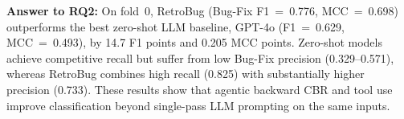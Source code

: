 

\begin{tcolorbox}[colback=gray!8, colframe=gray!50,
  boxrule=0.5pt, arc=2pt, left=4pt, right=4pt,
  top=3pt, bottom=3pt]
\textbf{Answer to RQ2:}
On fold~0, RetroBug (Bug-Fix F1~=~0.776, MCC~=~0.698) outperforms the
best zero-shot LLM baseline, GPT-4o (F1~=~0.629, MCC~=~0.493), by 14.7
F1 points and 0.205 MCC points.
Zero-shot models achieve competitive recall but suffer from low Bug-Fix
precision (0.329--0.571), whereas RetroBug combines high recall (0.825)
with substantially higher precision (0.733).
These results show that agentic backward CBR and tool use improve
classification beyond single-pass LLM prompting on the same inputs.
\end{tcolorbox}
